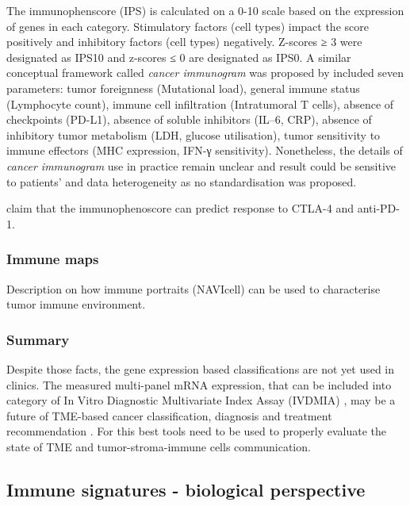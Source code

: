 \documentclass[12pt,]{book}
\theoremstyle{definition}
\theoremstyle{definition}
\theoremstyle{definition}
\theoremstyle{remark}
\begin{document}
The immunophenscore (IPS) is calculated on a 0-10 scale based on the
expression of genes in each category. Stimulatory factors (cell types)
impact the score positively and inhibitory factors (cell types)
negatively. Z-scores ≥ 3 were designated as IPS10 and z-scores ≤ 0 are
designated as IPS0. A similar conceptual framework called \emph{cancer
immunogram} was proposed by \citet{Blank2016} included seven parameters:
tumor foreignness (Mutational load), general immune status (Lymphocyte
count), immune cell infiltration (Intratumoral T cells), absence of
checkpoints (PD-L1), absence of soluble inhibitors (IL--6, CRP), absence
of inhibitory tumor metabolism (LDH, glucose utilisation), tumor
sensitivity to immune effectors (MHC expression, IFN-γ sensitivity).
Nonetheless, the details of \emph{cancer immunogram} use in practice
remain unclear and result could be sensitive to patients' and data
heterogeneity as no standardisation was proposed.

\citet{Charoentong2017} claim that the immunophenoscore can predict
response to CTLA-4 and anti-PD-1.

\hypertarget{immune-maps}{%
\subsubsection{Immune maps}\label{immune-maps}}

Description on how immune portraits (NAVIcell) can be used to
characterise tumor immune environment.

\hypertarget{summary-1}{%
\subsubsection{Summary}\label{summary-1}}

Despite those facts, the gene expression based classifications are not
yet used in clinics. The measured multi-panel mRNA expression, that can
be included into category of In Vitro Diagnostic Multivariate Index
Assay (IVDMIA) \citep{Gyorffy2015, Ross2008}, may be a future of
TME-based cancer classification, diagnosis and treatment recommendation
\citep{Gnjatic2017}. For this best tools need to be used to properly
evaluate the state of TME and tumor-stroma-immune cells communication.

\hypertarget{immune-signatures}{%
\subsection{Immune signatures - biological
perspective}\label{immune-signatures}}
\end{document}

